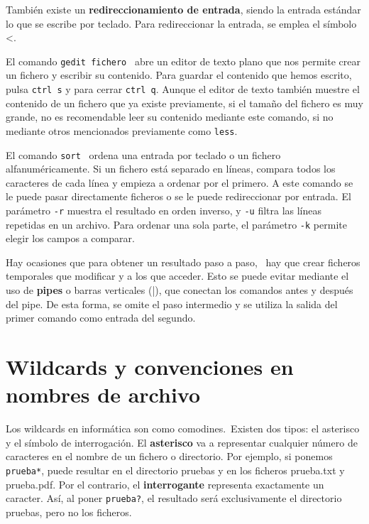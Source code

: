 También existe un \textbf{redireccionamiento de entrada}, siendo la entrada estándar lo que se escribe por teclado. Para redireccionar la entrada, se emplea el símbolo <.  \marginpar[\footnotesize <] \ 

El comando \texttt{gedit fichero}  \ abre un editor de texto plano que nos permite crear un fichero y escribir su contenido. Para guardar el contenido que hemos escrito, pulsa \texttt{ctrl s} y para cerrar \texttt{ctrl q}. Aunque el editor de texto también muestre el contenido de un fichero que ya existe previamente, si el tamaño del fichero es muy grande, no es recomendable leer su contenido mediante este comando, si no mediante otros mencionados previamente como \texttt{less}.

El comando \texttt{sort}  \ ordena una entrada por teclado o un fichero alfanuméricamente. Si un fichero está separado en líneas, compara todos los caracteres de cada línea y empieza a ordenar por el primero. A este comando se le puede pasar directamente ficheros o se le puede redireccionar por entrada. El parámetro \texttt{-r} muestra el resultado en orden inverso, y \texttt{-u} filtra las líneas repetidas en un archivo. Para ordenar una sola parte, el parámetro \texttt{-k} permite elegir los campos a comparar.

Hay ocasiones que para obtener un resultado paso a paso,  \marginpar[\footnotesize |] \ hay que crear ficheros temporales que modificar y a los que acceder. Esto se puede evitar mediante el uso de \textbf{pipes} o barras verticales (|), que conectan los comandos antes y después del pipe. De esta forma, se omite el paso intermedio y se utiliza la salida del primer comando como entrada del segundo. 

\section{Wildcards y convenciones en nombres de archivo}
Los wildcards en informática son como comodines.\marginpar[\footnotesize * \\ ?] \ Existen dos tipos: el asterisco y el símbolo de interrogación. El \textbf{asterisco} va a representar cualquier número de caracteres en el nombre de un fichero o directorio. Por ejemplo, si ponemos \texttt{prueba*}, puede resultar en el directorio pruebas y en los ficheros prueba.txt y prueba.pdf. Por el contrario, el \textbf{interrogante} representa exactamente un caracter. Así, al poner \texttt{prueba?}, el resultado será exclusivamente el directorio pruebas, pero no los ficheros.

